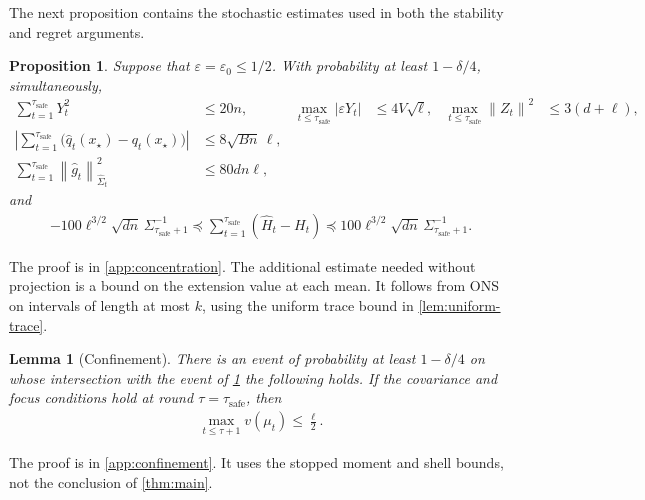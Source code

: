\documentclass[11pt]{article}
\newtheorem{proposition}[proposition]{Proposition}
\newtheorem{lemma}[lemma]{Lemma}
\newcommand{\1}{\mathbf 1}
\newcommand{\eps}{\varepsilon}
\newcommand{\norm}[1]{\left\lVert #1\right\rVert}
\newcommand{\normm}[2]{\left\lVert #1\right\rVert_{#2}}
\begin{document}
The next proposition contains the stochastic estimates used in both the
stability and regret arguments.
\begin{proposition}
    \label{prop:concentration}
    Suppose that $\eps=\eps_0\leq1/2$. With probability at least
    $1-\delta/4$, simultaneously,
    \begin{align}
        \sum_{t=1}^{\tau_{\mathrm{safe}}}Y_t^2 & \leq20n,
                                               & \max_{t\leq\tau_{\mathrm{safe}}}|\eps Y_t|   & \leq4V\sqrt\ell,
                                               & \max_{t\leq\tau_{\mathrm{safe}}}\norm{Z_t}^2 & \leq3(d+\ell),
        \label{eq:stopped-increment-bounds}
        \\
        \left|
        \sum_{t=1}^{\tau_{\mathrm{safe}}}
        \bigl(\widehat q_t(x_\star)-q_t(x_\star)\bigr)
        \right|
                                               & \leq8\sqrt{Bn}\,\ell,
        \label{eq:q-concentration}
        \\
        \sum_{t=1}^{\tau_{\mathrm{safe}}}
        \normm{\widehat g_t}{\widehat\Sigma_t}^2
                                               & \leq80dn\ell,
        \label{eq:gradient-energy}
    \end{align}
    and
    \begin{align}
        -100\ell^{3/2}\sqrt{dn}\,
        \Sigma_{\tau_{\mathrm{safe}}+1}^{-1}
        \preceq
        \sum_{t=1}^{\tau_{\mathrm{safe}}}(\widehat H_t-H_t)
        \preceq
        100\ell^{3/2}\sqrt{dn}\,
        \Sigma_{\tau_{\mathrm{safe}}+1}^{-1}.
        \label{eq:H-concentration}
    \end{align}
\end{proposition}
The proof is in \cref{app:concentration}. The additional estimate needed
without projection is a bound on the extension value at each mean.
It follows from ONS on intervals of length at most $k$, using the
uniform trace bound in \cref{lem:uniform-trace}.
\begin{lemma}[Confinement]
    \label{lem:confinement}
    There is an event of probability at least $1-\delta/4$ on whose
    intersection with the event of \cref{prop:concentration} the following
    holds. If the covariance and focus conditions hold at round
    $\tau=\tau_{\mathrm{safe}}$, then
    \begin{align}
        \max_{t\leq\tau+1}v(\mu_t)\leq\frac\ell2.
        \label{eq:confinement}
    \end{align}
\end{lemma}
The proof is in \cref{app:confinement}. It uses the stopped moment and
shell bounds, not the conclusion of \cref{thm:main}.
\end{document}
